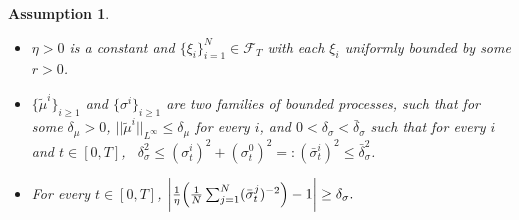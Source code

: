 \documentclass[10pt,a4paper]{article}
\newcommand{\E}{\mathbb{E}}
\newcommand{\MF}{{\mathcal{F}}}
\theoremstyle{plain}
\newtheorem{Remark}[Theorem]{Remark}
\newtheorem{Assumption}[Theorem]{Assumption}
\theoremstyle{definition}
\numberwithin{equation}{section}
\begin{document}
\begin{Assumption}\label{assu:pi-model} 
\begin{itemize}


\item[\textnormal{(A1).}] $\eta>0$ is a constant and $\{\xi_{i}\}_{i=1}^N \in \mathcal{F}_{T}$ with each $\xi_i$ uniformly bounded by some $r>0$. 



\item[\textnormal{(A2).}] $ \{\tilde{\mu}^{i}\}_{i \geq 1} $ {and} $ \{\sigma^{i}\}_{i \geq 1}$ are two families of bounded processes, such that for some $\delta_{\mu}>0$, $||\tilde{\mu}^{i}||_{L^{\infty}}\leq \delta_{\mu}$ for every $i$, and $ 0 < \delta_{\sigma} < \bar{\delta}_{\sigma}$ such that  for every $i$ and $t \in [0,T]$, \  $\delta_{\sigma}^{2} \leq (\sigma_{t}^{i})^{2}+(\sigma_{t}^{0})^{2} =: (\bar{\sigma}_{t}^{i})^{2} \leq \bar{\delta}_{\sigma}^{2}$.

\item[\textnormal{(A3).}] For every $t \in [0,T]$, 
$
\biggl|\tfrac{1}{\eta}\Bigl(\tfrac{1}{N}\sum_{j=1}^{N}(\bar{\sigma}_{t}^{j})^{-2}\Bigr)-1\biggr|
\geq \delta_{\sigma}. 
$
    
\end{itemize}

 




\end{Assumption}
\end{document}
